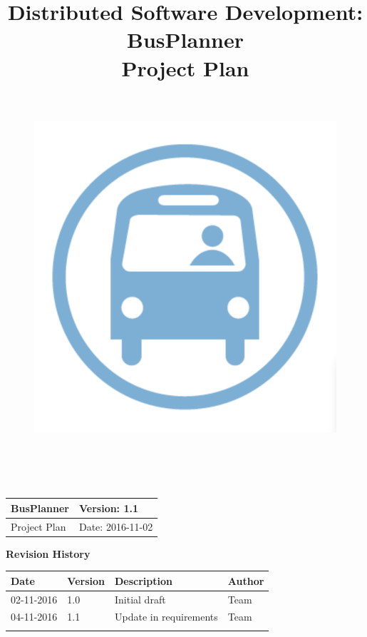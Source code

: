 \documentclass[a4paper, 12pt]{article}
\title{
	\textbf{D}istributed \textbf{S}oftware \textbf{D}evelopment: \textbf{BusPlanner}\\
	\textbf{Project Plan}\\
	\begin{figure}[H]
		\centering
		\includegraphics[width=13cm, height=13cm]{Bus_logo}
	\end{figure}
\date{}
}
\begin{document}
	\begin{table}[t]
		\centering
		\begin{tabular}{| m{6cm} | m{6cm} |}
			\hline
			BusPlanner & Version: 1.1\\
			\hline
			Project Plan & Date: 2016-11-02\\
			\hline
		\end{tabular}
	\end{table}
	\maketitle
	\begin{center}
		\textbf{\Large Revision History}
	\end{center}
	\begin{table}[h]
		\centering
		\begin{tabular}{| m{2cm} | m{2cm} | m{6cm} | m{2cm} |}
			\hline
			\textbf{Date} & \textbf{Version} & \textbf{Description} & \textbf{Author}\\
			\hline
			02-11-2016 & 1.0 & Initial draft & Team\\
			\hline
			04-11-2016 & 1.1 & Update in requirements & Team\\
			\hline
			&&&\\
			\hline
		\end{tabular}
	\end{table}
\newpage
	\tableofcontents
	
	
	
	
	
	
	
\end{document}

